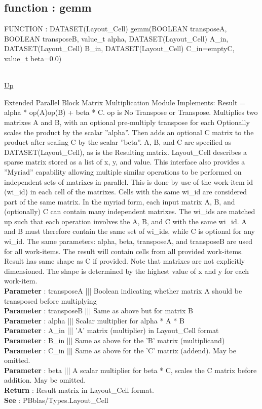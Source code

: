 \subsection*{function : gemm}
\hypertarget{ecldoc:pbblas.gemm}{FUNCTION : DATASET(Layout\_Cell) gemm(BOOLEAN transposeA, BOOLEAN transposeB, value\_t alpha, DATASET(Layout\_Cell) A\_in, DATASET(Layout\_Cell) B\_in, DATASET(Layout\_Cell) C\_in=emptyC, value\_t beta=0.0)} \\
\hyperlink{ecldoc:}{Up} \\
\par
Extended Parallel Block Matrix Multiplication Module Implements: Result = alpha * op(A)op(B) + beta * C. op is No Transpose or Transpose. Multiplies two matrixes A and B, with an optional pre-multiply transpose for each Optionally scales the product by the scalar ''alpha''. Then adds an optional C matrix to the product after scaling C by the scalar ''beta''. A, B, and C are specified as DATASET(Layout\_Cell), as is the Resulting matrix. Layout\_Cell describes a sparse matrix stored as a list of x, y, and value. This interface also provides a ''Myriad'' capability allowing multiple similar operations to be performed on independent sets of matrixes in parallel. This is done by use of the work-item id (wi\_id) in each cell of the matrixes. Cells with the same wi\_id are considered part of the same matrix. In the myriad form, each input matrix A, B, and (optionally) C can contain many independent matrixes. The wi\_ids are matched up such that each operation involves the A, B, and C with the same wi\_id. A and B must therefore contain the same set of wi\_ids, while C is optional for any wi\_id. The same parameters: alpha, beta, transposeA, and transposeB are used for all work-items. The result will contain cells from all provided work-items. Result has same shape as C if provided. Note that matrixes are not explicitly dimensioned. The shape is determined by the highest value of x and y for each work-item. \\
\textbf{Parameter} : transposeA ||| Boolean indicating whether matrix A should be transposed before multiplying \\
\textbf{Parameter} : transposeB ||| Same as above but for matrix B \\
\textbf{Parameter} : alpha ||| Scalar multiplier for alpha * A * B \\
\textbf{Parameter} : A\_in ||| 'A' matrix (multiplier) in Layout\_Cell format \\
\textbf{Parameter} : B\_in ||| Same as above for the 'B' matrix (multiplicand) \\
\textbf{Parameter} : C\_in ||| Same as above for the 'C' matrix (addend). May be omitted. \\
\textbf{Parameter} : beta ||| A scalar multiplier for beta * C, scales the C matrix before addition. May be omitted. \\
\textbf{Return} : Result matrix in Layout\_Cell format. \\
\textbf{See} : PBblas/Types.Layout\_Cell \\
